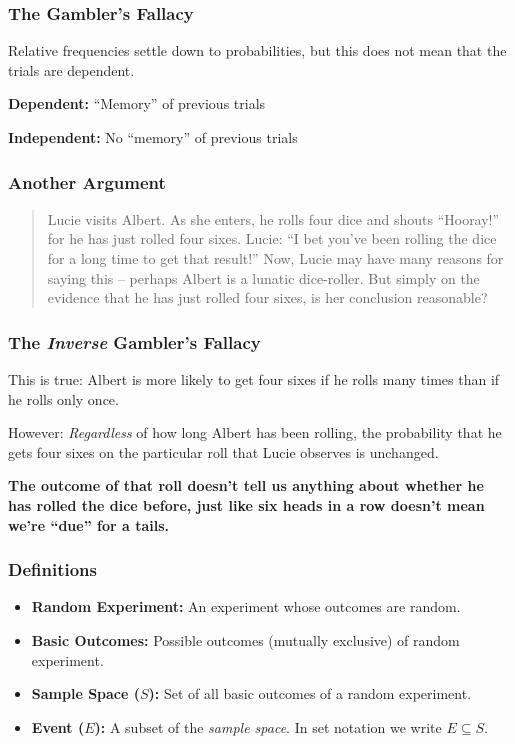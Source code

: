 \documentclass{beamer}
\begin{document}
\begin{frame}
\frametitle{The Gambler's Fallacy}
	\alert{Relative frequencies settle down to probabilities, but this does not mean that the trials are 
	dependent.}
	
    \textbf{Dependent:} ``Memory'' of previous trials

	\textbf{Independent:} No ``memory'' of previous trials
\end{frame}

\begin{frame}
\frametitle{Another Argument}
	\begin{quote}
	Lucie visits Albert. As she enters, he rolls four dice and shouts ``Hooray!'' for he has just rolled 
	four sixes. Lucie: ``I bet you've been rolling the dice for a long time to get that result!'' Now, Lucie 
	may have many reasons for saying this -- perhaps Albert is a lunatic dice-roller. But simply on the 
	evidence that he has just rolled four sixes, is her conclusion reasonable?
	\end{quote}
\end{frame}
\begin{frame}
\frametitle{The \emph{Inverse} Gambler's Fallacy}
	\begin{block}{This is true:}
	    Albert is more likely to get four sixes if he rolls many times than if he rolls only once.
	\end{block}
	\begin{block}{However:} 
	    \emph{Regardless} of how long Albert has been rolling, the probability that he gets four sixes 
	    \alert{on the particular roll that Lucie observes} is unchanged. 
    \end{block}
	\vspace{2em}
	\textbf{The outcome of that roll doesn't tell us anything about whether he has rolled the dice 
	before, just like six heads in a row doesn't mean we're ``due'' for a tails.}
\end{frame}

\begin{frame}
\frametitle{Definitions}
    \begin{itemize}
        \item \textbf{Random Experiment:} An experiment whose outcomes are random.
        \item \textbf{Basic Outcomes:} Possible outcomes (mutually exclusive) of random experiment.
        \item \textbf{Sample Space ($S$):} Set of all basic outcomes of a random experiment.
        \item \textbf{Event ($E$):} A subset of the \textit{sample space}. In set notation we write $E 
        \subseteq S$.
    \end{itemize}
\end{frame}
\end{document}
